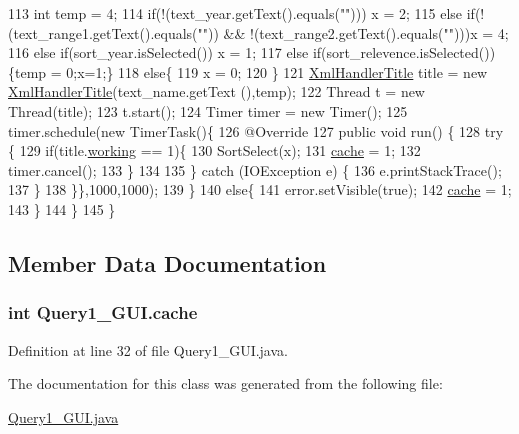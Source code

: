 \begin{DoxyCode}
113                 \textcolor{keywordtype}{int} temp = 4;
114                 \textcolor{keywordflow}{if}(!(text\_year.getText().equals(\textcolor{stringliteral}{""}))) x = 2;
115                 \textcolor{keywordflow}{else} \textcolor{keywordflow}{if}(!(text\_range1.getText().equals(\textcolor{stringliteral}{""})) && !(text\_range2.getText().equals(\textcolor{stringliteral}{""})))x = 4;
116                 \textcolor{keywordflow}{else} \textcolor{keywordflow}{if}(sort\_year.isSelected()) x = 1;
117                 \textcolor{keywordflow}{else} \textcolor{keywordflow}{if}(sort\_relevence.isSelected())\{temp = 0;x=1;\}
118                 \textcolor{keywordflow}{else}\{
119                     x = 0;
120                 \}
121                 \hyperlink{classXmlHandlerTitle}{XmlHandlerTitle} title = \textcolor{keyword}{new} \hyperlink{classXmlHandlerTitle}{XmlHandlerTitle}(text\_name.getText
      (),temp);
122                 Thread t = \textcolor{keyword}{new} Thread(title);
123                 t.start();
124                 Timer timer = \textcolor{keyword}{new} Timer();
125                 timer.schedule(\textcolor{keyword}{new} TimerTask()\{
126                     @Override
127                     \textcolor{keyword}{public} \textcolor{keywordtype}{void} run() \{
128                         \textcolor{keywordflow}{try} \{
129                             \textcolor{keywordflow}{if}(title.\hyperlink{classXmlHandlerTitle_a8430143db4f1036e5db03fbe7e3d451f}{working} == 1)\{
130                                 SortSelect(x);
131                                 \hyperlink{classQuery1__GUI_aefa26438c30d278901bd04f6f83b57c0}{cache} = 1;
132                                 timer.cancel();
133                             \}
134                             
135                         \} \textcolor{keywordflow}{catch} (IOException e) \{
136                             e.printStackTrace();
137                         \}
138                 \}\},1000,1000);
139             \}
140             \textcolor{keywordflow}{else}\{
141                 error.setVisible(\textcolor{keyword}{true});
142                 \hyperlink{classQuery1__GUI_aefa26438c30d278901bd04f6f83b57c0}{cache} = 1;
143             \}
144         \}
145     \}
\end{DoxyCode}


\subsection{Member Data Documentation}
\hypertarget{classQuery1__GUI_aefa26438c30d278901bd04f6f83b57c0}{
\subsubsection[{cache}]{\setlength{\rightskip}{0pt plus 5cm}int Query1\-\_\-\-G\-U\-I.\-cache}}\label{classQuery1__GUI_aefa26438c30d278901bd04f6f83b57c0}


Definition at line 32 of file Query1\-\_\-\-G\-U\-I.\-java.



The documentation for this class was generated from the following file\-:\begin{DoxyCompactItemize}
\item 
\hyperlink{Query1__GUI_8java}{Query1\-\_\-\-G\-U\-I.\-java}\end{DoxyCompactItemize}
